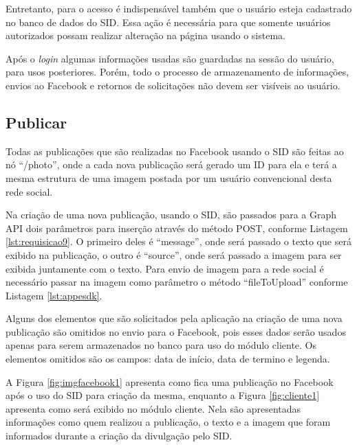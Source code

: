Entretanto, para o acesso é indispensável também que o usuário esteja cadastrado no banco de dados do SID. Essa ação é necessária para que somente usuários autorizados possam realizar alteração na página usando o sistema.

Após o \textit{login} algumas informações usadas são guardadas na sessão do usuário, para usos posteriores. Porém, todo o processo de armazenamento de informações, envios ao Facebook e retornos de solicitações não devem ser visíveis ao usuário. 

\subsection{Publicar}
Todas as publicações que são realizadas no Facebook usando o SID são feitas ao nó ``/photo'', onde a cada nova publicação será gerado um ID para ela e terá a mesma estrutura de uma imagem postada por um usuário convencional desta rede social.

Na criação de uma nova publicação, usando o SID, são passados para a Graph API dois parâmetros para inserção através do método POST, conforme Listagem \ref{lst:requisicao9}. O primeiro deles é “message”, onde será passado o texto que será exibido na publicação, o outro é “source”, onde será passado a imagem para ser exibida juntamente com o texto. Para envio de imagem para a rede social é necessário passar na imagem como parâmetro o método “fileToUpload” conforme Listagem \ref{lst:appesdk}. 

Alguns dos elementos que são solicitados pela aplicação na criação de uma nova publicação são omitidos no envio para o Facebook, pois esses dados serão usados apenas para serem armazenados no banco para uso do módulo cliente. Os elementos omitidos são os campos: data de início, data de termino e legenda. 

A Figura \ref{fig:imgfacebook1} apresenta como fica uma publicação no Facebook após o uso do SID para criação da mesma, enquanto a Figura \ref{fig:cliente1} apresenta como será exibido no módulo cliente. Nela são apresentadas informações como quem realizou a publicação, o texto e a imagem que foram informados durante a criação da divulgação pelo SID.

